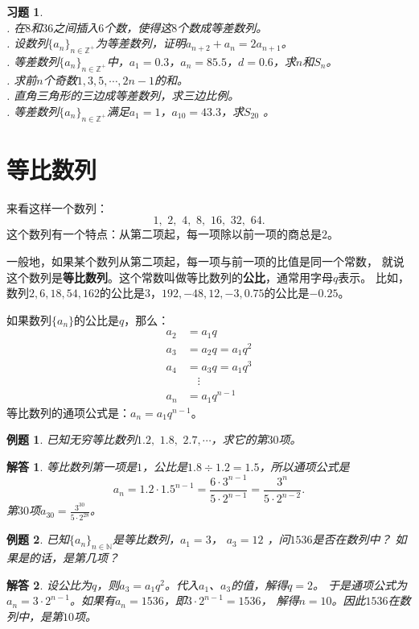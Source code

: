 \documentclass[12pt,UTF8]{ctexbook}
\newtheorem{et}{例题}[section]
\newtheorem*{so}{解答}
\newtheorem{xt}{习题}[section]
\begin{document}
\begin{xt}
    \mbox{} \\
    . 在$8$和$36$之间插入$6$个数，使得这$8$个数成等差数列。\\
    . 设数列$\{a_n\}_{n\in\mathbb{Z}^+}$为等差数列，证明$a_{n+2} + a_n = 2a_{n+1}$。\\
    . 等差数列$\{a_n\}_{n\in\mathbb{Z}^+}$中，$a_1 = 0.3$，$a_n = 85.5$，$d = 0.6$，求$n$和$S_n$。\\
    . 求前$n$个奇数$1,3,5,\cdots, 2n-1$的和。\\
    . 直角三角形的三边成等差数列，求三边比例。\\
    . 等差数列$\{a_n\}_{n\in\mathbb{Z}^+}$满足$a_1 = 1$，$a_{10}=43.3$，求$S_{20}$ 。    
\end{xt}

\section{等比数列}

来看这样一个数列：
$$ 1,\,\,2,\,\,4,\,\,8,\,\,16,\,\,32,\,\,64. $$
这个数列有一个特点：从第二项起，每一项除以前一项的商总是$2$。

一般地，如果某个数列从第二项起，每一项与前一项的比值是同一个常数，
就说这个数列是\textbf{等比数列}。这个常数叫做等比数列的\textbf{公比}，通常用字母$q$表示。
比如，数列$2,6,18,54,162$的公比是$3$，$192,-48,12,-3,0.75$的公比是$-0.25$。

如果数列$\{a_n\}$的公比是$q$，那么：
\begin{align*}
a_2 &= a_1 q   \\
a_3 &= a_2 q = a_1 q^2  \\
a_4 &= a_3 q = a_1 q^3  \\
&\quad \vdots  \\
a_n &= a_1 q^{n-1}  
\end{align*}
等比数列的通项公式是：$a_n = a_1 q^{n-1}$。
\begin{et}
    已知无穷等比数列$1.2, \,\,1.8,\,\,2.7, \cdots$，求它的第$30$项。    
\end{et}
\begin{so}
等比数列第一项是$1$，公比是$1.8\div1.2=1.5$，所以通项公式是
$$a_n = 1.2 \cdot 1.5^{n-1} = \frac{6\cdot3^{n-1}}{5\cdot2^{n-1}} = \frac{3^n}{5\cdot 2^{n-2}}.$$
第$30$项$a_{30} = \frac{3^{30}}{5\cdot 2^{28}}$。
\end{so}
\begin{et}
    已知$\{a_n\}_{n\in\mathbb{N}}$是等比数列，$a_1 = 3$， $a_3 = 12$ ，问$1536$是否在数列中？
    如果是的话，是第几项？    
\end{et}
\begin{so}
    设公比为$q$，则$a_3 = a_1 q^2$。代入$a_1$、$a_3$的值，解得$q = 2$。
    于是通项公式为$a_n = 3\cdot 2^{n-1}$。如果有$a_n = 1536$，即$3\cdot2^{n-1}=1536$，
    解得$n = 10$。因此$1536$在数列中，是第$10$项。    
\end{so}
\end{document}
